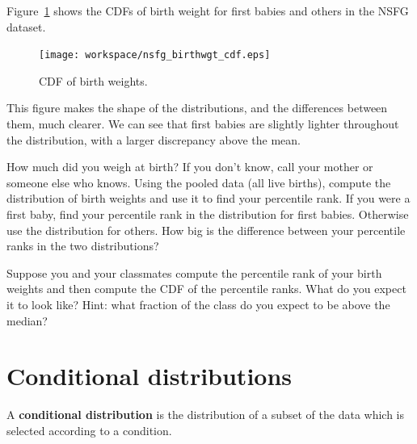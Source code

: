 \documentclass[12pt]{book}
\begin{document}
Figure~\ref{nsfg_birthwgt_cdf} shows the CDFs of birth weight for
first babies and others in the NSFG dataset.

\begin{figure}
\centerline{\texttt{[image: workspace/nsfg\_birthwgt\_cdf.eps]}}
\caption{CDF of birth weights.}
\label{nsfg_birthwgt_cdf}
\end{figure}

This figure makes the shape of the distributions, and the differences
between them, much clearer.  We can see that first babies are slightly
lighter throughout the distribution, with a larger discrepancy above 
the mean.




\begin{ex}

How much did you weigh at birth?  If you don't know, call your mother
or someone else who knows.  Using the pooled data (all live births),
compute the distribution of birth weights and use it to find your
percentile rank.  If you were a first baby, find your percentile rank
in the distribution for first babies.  Otherwise use the distribution
for others.  How big is the difference between your percentile ranks
in the two distributions?

\end{ex}

\begin{ex}

Suppose you and your classmates compute the percentile rank of your
birth weights and then compute the CDF of the percentile ranks.  What do
you expect it to look like?  Hint: what fraction of the class do you
expect to be above the median?

\end{ex}


\section{Conditional distributions}

A {\bf conditional distribution} is the distribution of a subset of
the data which is selected according to a condition.
\end{document}
